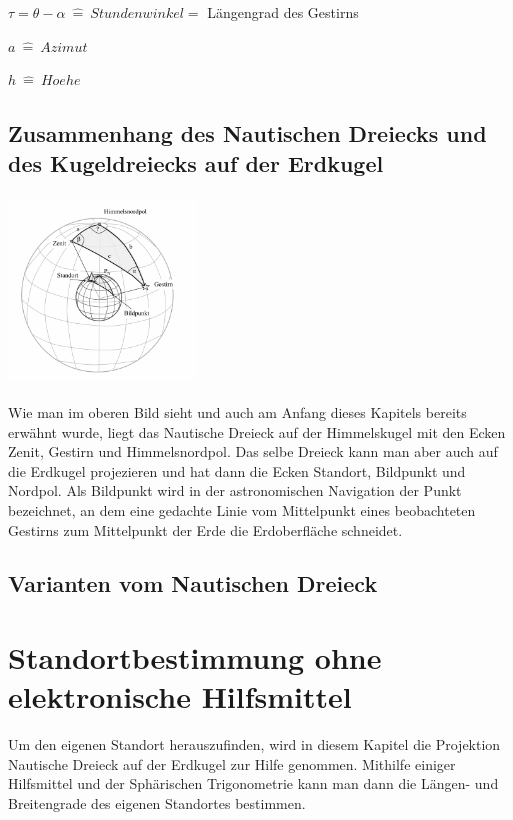 \documentclass[12pt]{scrartcl}
\begin{document}
$\tau = \theta-\alpha \ \widehat{=} \ Stundenwinkel =$ Längengrad des Gestirns 

$a \ \widehat{=} \ Azimut $

$h \ \widehat{=} \ Hoehe$



\subsection{Zusammenhang des Nautischen Dreiecks und des Kugeldreiecks auf der Erdkugel}

	\begin{center}
	\includegraphics[height=5cm,width=5cm]{Bilder/kugel3.png}
	\end{center}
Wie man im oberen Bild sieht und auch am Anfang dieses Kapitels bereits erwähnt wurde, liegt das Nautische Dreieck auf der Himmelskugel mit den Ecken Zenit, Gestirn und Himmelsnordpol. 
Das selbe Dreieck kann man aber auch auf die Erdkugel projezieren und hat dann die Ecken Standort, Bildpunkt und Nordpol. 
Als Bildpunkt wird in der astronomischen Navigation der Punkt bezeichnet, an dem eine gedachte Linie vom Mittelpunkt eines beobachteten Gestirns zum Mittelpunkt der Erde die Erdoberfläche schneidet.

\subsection{Varianten vom Nautischen Dreieck}
\section{Standortbestimmung ohne elektronische Hilfsmittel}
Um den eigenen Standort herauszufinden, wird in diesem Kapitel die Projektion Nautische Dreieck auf der Erdkugel zur Hilfe genommen. 
Mithilfe einiger Hilfsmittel und der Sphärischen Trigonometrie kann man dann die Längen- und Breitengrade des eigenen Standortes bestimmen.
\end{document}
